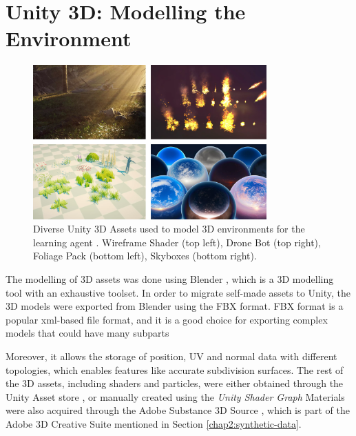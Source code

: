 
\section{Unity 3D: Modelling the Environment}\label{appendix:unity3d-environment-modeling}
\begin{figure}[!ht]
        \centering
        \includegraphics[width=0.8\textwidth]{images/unity-assets.png}
        \caption{Diverse Unity 3D Assets used to model 3D environments for the learning agent \cite{unityAssetStore}. Wireframe Shader (top left), Drone Bot (top right), Foliage Pack (bottom left), Skyboxes (bottom right).
        }
        \label{fig:assets-unity}
\end{figure}
The modelling of 3D assets was done using Blender 
, which is a 3D modelling tool with an exhaustive toolset. In order to migrate self-made assets to Unity, the 3D models were exported from Blender using the FBX format. FBX format is a popular xml-based file format, and it is a good choice for exporting complex models that could have many subparts 

Moreover, it allows the storage of position, UV and normal data with different topologies, which enables features like accurate subdivision surfaces. 
The rest of the 3D assets, including shaders and particles, were either obtained through the Unity Asset store 
, or manually created using the \textit{Unity Shader Graph} 
Materials were also acquired through the Adobe Substance 3D Source \cite{}, which is part of the Adobe 3D Creative Suite mentioned in Section \ref{chap2:synthetic-data}. 


